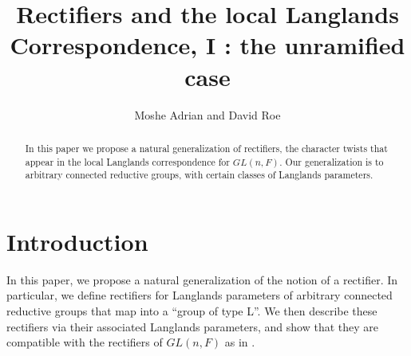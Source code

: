 \documentclass[11pt]{amsart}
\theoremstyle{plain}
\theoremstyle{definition}
\begin{document}
\title{Rectifiers and the local Langlands Correspondence, I : the unramified case}
\author{Moshe Adrian and David Roe}



\begin{abstract}

In this paper we propose a natural generalization of rectifiers, the
character twists that appear in the local Langlands correspondence for
$GL(n,F)$.  Our generalization is to arbitrary connected reductive
groups, with certain classes of Langlands parameters.

\end{abstract}

\maketitle

\section{Introduction}
In this paper, we propose a natural generalization of the notion of a
rectifier.  In particular, we define rectifiers for Langlands
parameters of arbitrary connected reductive groups that map into a
``group of type L''.  We then describe these rectifiers via their
associated Langlands parameters, and show that they are compatible
with the rectifiers of $GL(n,F)$ as in \cite{bushnellhenniart}.
\end{document}
